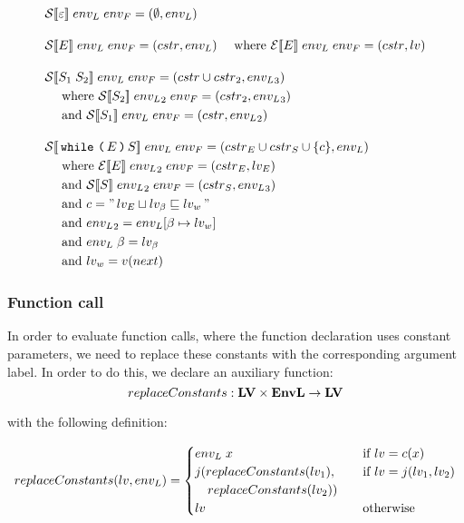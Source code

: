 \begin{align*}
& \iS\dblSq{\varepsilon} \; \ienvL \; \ienvF = (\emptyset, \ienvL) \rspace
%
& \iS\dblSq{E} \; \ienvL \; \ienvF = (\icstr, \ienvL) \dsWhere{\iE\dblSq{E} \; \ienvL \; \ienvF = (\icstr, \ilv)} \rspace
%
& \iS\dblSq{S_1 \; S_2} \; \ienvL \; \ienvF = (\icstr \cup \icstr_2, \ienvL_3) \\
& \dsWhere{\iS\dblSq{S_2} \; \ienvL_2 \; \ienvF = (\icstr_2, \ienvL_3)} \\
& \dsAnd{\iS\dblSq{S_1} \; \ienvL \; \ienvF = (\icstr, \ienvL_2)} \rspace
%
& \iS\dblSq{\tk{while} \tk ( E \tk ) S} \; \ienvL \; \ienvF = (\icstr_E \cup \icstr_S \cup \{ c \}, \ienvL) \\
& \dsWhere{\iE\dblSq{E} \; \ienvL_2 \; \ienvF = (\icstr_E, \ilv_E)} \\
& \dsAnd{\iS\dblSq{S} \; \ienvL_2 \; \ienvF = (\icstr_S, \ienvL_3)} \\
& \dsAnd{c = \literal{\ilv_E \sqcup \ilv_\ib \sqsubseteq \ilv_w}} \\
& \dsAnd{\ienvL_2 = \ienvL[\ib \mapsto \ilv_w]} \\
& \dsAnd{\ienvL \; \ib = \ilv_\ib} \\
& \dsAnd{\ilv_w = v(next)}
\end{align*}

\subsubsection{Function call}
In order to evaluate function calls, where the function declaration uses constant parameters, we need to replace these constants with the corresponding argument label.
In order to do this, we declare an auxiliary function:
\[ replaceConstants : \mathbf{LV} \times \mathbf{EnvL} \rightarrow \mathbf{LV} \]

with the following definition:

\[replaceConstants(lv, {env_L}) = \begin{cases}
  {env_L} \; x & \quad \text{if } lv = c(x) \\
  j(replaceConstants(lv_1), & \quad \text{if } lv = j(lv_1, lv_2) \\
  \quad replaceConstants(lv_2)) & \\
  lv & \quad \text{otherwise}
\end{cases} \]

